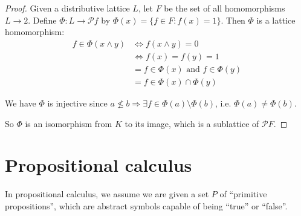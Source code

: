 \documentclass[a4paper]{article}
\theoremstyle{definition}
\let\stdsection\section
\renewcommand\section{\newpage\stdsection}
\begin{document}
\begin{proof}
  Given a distributive lattice $L$, let $F$ be the set of all homomorphisms $L\to 2$. Define $\Phi: L\to \mathcal{P}f$ by $\Phi(x) = \{f\in F: f(x) = 1\}$.
  Then $\Phi$ is a lattice homomorphism:
  \begin{align*}
    f\in \Phi(x\wedge y)&\Leftrightarrow f(x\wedge y) = 0\\
    &\Leftrightarrow f(x) = f(y) = 1\\
    &= f\in \Phi(x)\text{ and }f\in \Phi(y)\\
    &= f\in \Phi(x)\cap \Phi(y)
  \end{align*}

  We have $\Phi$ is injective since $a\not\leq b\Rightarrow \exists f\in \Phi(a)\setminus \Phi(b)$, i.e. $\Phi(a)\not= \Phi(b)$.

  So $\Phi$ is an isomorphism from $K$ to its image, which is a sublattice of $\mathcal{P}F$.
\end{proof}

\section{Propositional calculus}
In propositional calculus, we assume we are given a set $P$ of ``primitive propositions'', which are abstract symbols capable of being ``true'' or ``false''.
\end{document}
